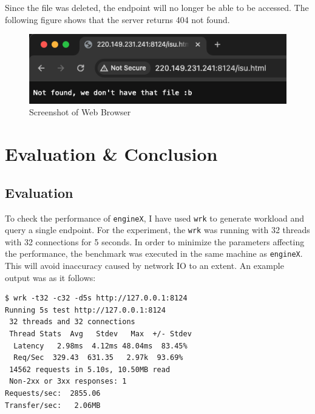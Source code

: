 \documentclass{homework}
\begin{document}
Since the file was deleted, the endpoint will no longer be able to be accessed. The following figure shows that the server returns 404 not found.

\begin{figure}[h]
\begin{center}
\includegraphics[scale=0.6]{9_ss6.png}    
\caption{Screenshot of Web Browser}
\end{center}
\end{figure}

\pagebreak

\section{Evaluation \& Conclusion}
\subsection{Evaluation}
To check the performance of \texttt{engineX}, I have used \texttt{wrk} to generate workload and query a single endpoint. For the experiment, the \texttt{wrk} was running with 32 threads with 32 connections for 5 seconds. In order to minimize the parameters affecting the performance, the benchmark was executed in the same machine as \texttt{engineX}. This will avoid inaccuracy caused by network IO to an extent. An example output was as it follows:
\\
\begin{center}
\begin{code}
\begin{verbatim}
$ wrk -t32 -c32 -d5s http://127.0.0.1:8124
Running 5s test http://127.0.0.1:8124
 32 threads and 32 connections
 Thread Stats  Avg   Stdev   Max  +/- Stdev
  Latency   2.98ms  4.12ms 48.04ms  83.45%
  Req/Sec  329.43  631.35   2.97k  93.69%
 14562 requests in 5.10s, 10.50MB read
 Non-2xx or 3xx responses: 1
Requests/sec:  2855.06
Transfer/sec:   2.06MB
\end{verbatim}
\end{code}
\end{center}
\end{document}
